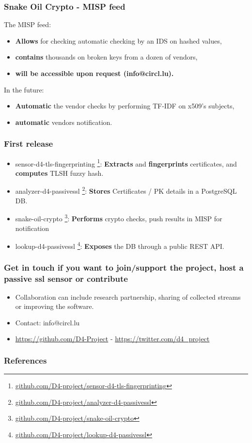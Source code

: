 \documentclass{beamer}
\begin{document}
\begin{frame}
   \frametitle{Snake Oil Crypto - MISP feed}
   The MISP feed:
   \begin{itemize}
     \item {\bf Allows} for checking automatic checking by an IDS on hashed values,
     \item {\bf contains} thousands on broken keys from a dozen of vendors,
     \item {\bf will be accessible upon request (info@circl.lu).}
   \end{itemize}

   In the future:
    \begin{itemize}
     \item {\bf Automatic} the vendor checks by performing TF-IDF on x509's subjects, 
     \item {\bf automatic} vendors notification.
     \end{itemize}

\end{frame}


\begin{frame}
  \frametitle{First release}
  \begin{itemize}
  \item[\checkmark] sensor-d4-tls-fingerprinting
    \footnote{\url{github.com/D4-project/sensor-d4-tls-fingerprinting}}:
    {\bf Extracts} and {\bf fingerprints} certificates, and {\bf computes} TLSH fuzzy hash.
  \item[\checkmark] analyzer-d4-passivessl
    \footnote{\url{github.com/D4-project/analyzer-d4-passivessl}}:
    {\bf Stores} Certificates / PK details in a PostgreSQL DB.
  \item snake-oil-crypto 
    \footnote{\url{github.com/D4-project/snake-oil-crypto}}:
    {\bf Performs} crypto checks, push results in MISP for notification
  \item lookup-d4-passivessl
    \footnote{\url{github.com/D4-project/lookup-d4-passivessl}}:
    {\bf Exposes} the DB through a public REST API.
  \end{itemize}
\end{frame}



\begin{frame}
\frametitle{Get in touch if you want to join/support the project, host a passive ssl sensor or contribute}
\begin{itemize}
\item Collaboration can include research partnership, sharing of collected streams or improving the software.
\item Contact: info@circl.lu
\item \url{https://github.com/D4-Project} -  \url{https://twitter.com/d4_project}
\end{itemize}
\end{frame}

\nocite{*} 
\begin{frame}[allowframebreaks]
        \frametitle{References}
        
        
\end{frame}
\end{document}
